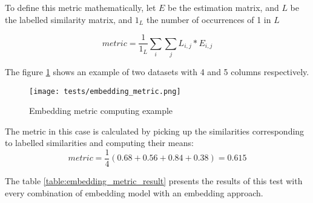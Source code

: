 To define this metric mathematically, let $E$ be the estimation matrix, and  $L$
be the labelled similarity matrix, and $1_L$ the number of occurrences of 1 in $L$

\begin{equation}
    metric = \frac{1}{1_L} \sum_i \sum_j L_{i,j} * E_{i,j}
\end{equation}

The figure \ref{fig:tests_embedding_metric} shows an example of two datasets
with 4 and 5 columns respectively.

\begin{figure}[h]
    \centering
    \texttt{[image: tests/embedding\_metric.png]}
    \caption{Embedding metric computing example}
    \label{fig:tests_embedding_metric}
\end{figure}

The metric in this case is calculated by picking up the similarities
corresponding to labelled similarities and computing their means:
\begin{equation}
    metric = \frac{1}{4} (0.68 + 0.56 + 0.84 + 0.38) = 0.615
\end{equation}

The table \ref{table:embedding_metric_result} presents the results of this test
with every combination of embedding model with an embedding approach.

\hspace{1cm}

